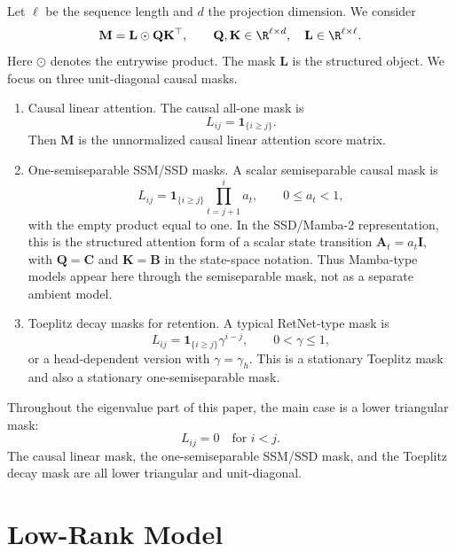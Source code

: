 \documentclass{article}
\newcommand{\one}{\mathbf{1}}
\newcommand{\hadamard}{\mathbin{\odot}}
\newcommand{\bM}{\mathbf{M}}
\newcommand{\bL}{\mathbf{L}}
\newcommand{\bQ}{\mathbf{Q}}
\newcommand{\bK}{\mathbf{K}}
\theoremstyle{remark}
\begin{document}
Let $\ell$ be the sequence length and $d$ the projection dimension.  We consider
\begin{equation}
    \bM=\bL\hadamard \bQ\bK^\top,\qquad
    \bQ,\bK\in\R^{\ell\times d},\quad
    \bL\in\R^{\ell\times \ell}.
    \label{eq:model}
\end{equation}
Here $\hadamard$ denotes the entrywise product.  The mask $\bL$ is the
structured object.  We focus on three unit-diagonal causal masks.

\begin{enumerate}
\item Causal linear attention.  The causal all-one mask is
\[
    L_{ij}=\one_{\{i\geq j\}} .
\]
Then $\bM$ is the unnormalized causal linear attention score matrix.

\item One-semiseparable SSM/SSD masks.  A scalar semiseparable causal mask is
\begin{equation}
    L_{ij}
    =
    \one_{\{i\geq j\}}\prod_{t=j+1}^{i}a_t,
    \qquad 0\leq a_t<1,
    \label{eq:semiseparable-mask}
\end{equation}
with the empty product equal to one.  In the SSD/Mamba-2 representation, this is
the structured attention form of a scalar state transition
$\mathbf A_t=a_t\mathbf I$, with $\bQ=\mathbf C$ and $\bK=\mathbf B$ in the
state-space notation.  Thus Mamba-type models appear here through the
semiseparable mask, not as a separate ambient model.

\item Toeplitz decay masks for retention.  A typical RetNet-type mask is
\[
    L_{ij}=\one_{\{i\geq j\}}\gamma^{i-j},
    \qquad 0<\gamma\leq 1,
\]
or a head-dependent version with $\gamma=\gamma_h$.  This is a stationary
Toeplitz mask and also a stationary one-semiseparable mask.
\end{enumerate}

Throughout the eigenvalue part of this paper, the main case is a lower
triangular mask:
\begin{equation}
    L_{ij}=0\quad\text{for }i<j.
    \label{eq:lower-triangular}
\end{equation}
The causal linear mask, the one-semiseparable SSM/SSD mask, and the Toeplitz
decay mask are all lower triangular and unit-diagonal.

\section{Low-Rank Model}
\end{document}
